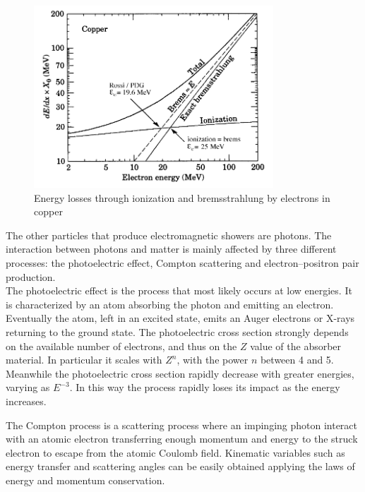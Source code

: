 \begin{figure}
	\centering
	\includegraphics[width=0.8\textwidth]{IMG/Cap2/Cu_rad_ion}
	\caption{Energy losses through ionization and bremsstrahlung by  electrons in copper \cite{PDG_98}}
	\label{fig:Cu_rad_ion}
\end{figure}

The other particles that produce electromagnetic showers are photons. The interaction between photons and matter is mainly affected by three different processes: the photoelectric effect, Compton scattering and electron–positron pair production.\\
The photoelectric effect is the process that most likely occurs at low energies. It is characterized by an atom absorbing the photon and emitting an electron. Eventually the atom, left in an excited state, emits an Auger electrons or X-rays returning to the ground state. The photoelectric cross section strongly depends on the available number of  electrons,  and  thus  on  the $Z$ value  of  the  absorber  material. In particular it scales with $Z^n$, with the power $n$ between 4 and 5. Meanwhile the photoelectric cross section rapidly decrease with greater energies, varying as $E^{-3}$. In this way the process rapidly loses its impact as the energy increases.

The Compton process is a scattering process where an impinging  photon interact with an atomic electron transferring enough momentum and energy to the struck electron to escape from the atomic Coulomb field. Kinematic variables such as energy transfer and scattering angles can be easily obtained applying the laws of energy and momentum conservation. 


